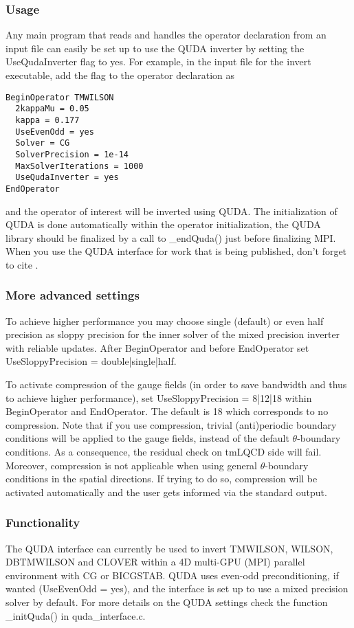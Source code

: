 \subsubsection{Usage}
Any main program that reads and handles the operator declaration from an input file can easily be set up to use the QUDA inverter by setting the {\ttfamily UseQudaInverter} flag to {\ttfamily yes}. For example, in the input file for the {\ttfamily invert} executable, add the flag to the operator declaration as
\begin{verbatim}
BeginOperator TMWILSON
  2kappaMu = 0.05
  kappa = 0.177
  UseEvenOdd = yes
  Solver = CG
  SolverPrecision = 1e-14
  MaxSolverIterations = 1000
  UseQudaInverter = yes
EndOperator
\end{verbatim}
and the operator of interest will be inverted using QUDA. The initialization of QUDA is done automatically within the operator initialization,  the QUDA library should be finalized by a call to {\ttfamily \_endQuda()} just before finalizing MPI. When you use the QUDA interface for work that is being published, don't forget to cite \cite{Clark:2009wm, Babich:2011np, Strelchenko:2013vaa}.


\subsubsection{More advanced settings}
To achieve higher performance you may choose single (default) or even half precision as sloppy precision for the inner solver of the mixed precision inverter with reliable updates. After {\ttfamily BeginOperator} and before {\ttfamily EndOperator} set {\ttfamily UseSloppyPrecision = double|single|half}.

To activate compression of the gauge fields (in order to save bandwidth and thus to achieve higher performance), set {\ttfamily UseSloppyPrecision = 8|12|18} within {\ttfamily BeginOperator} and {\ttfamily EndOperator}. The default is 18 which corresponds to no compression. Note that if you use compression, trivial (anti)periodic boundary conditions will be applied to the gauge fields, instead of the default $\theta$-boundary conditions. As a consequence, the residual check on tmLQCD side will fail. Moreover, compression is not applicable when using general $\theta$-boundary conditions in the spatial directions. If trying to do so, compression will be activated automatically and the user gets informed via the standard output.


\subsubsection{Functionality}
The QUDA interface can currently be used to invert {\ttfamily TMWILSON, WILSON, DBTMWILSON} and {\ttfamily CLOVER} within a 4D multi-GPU (MPI) parallel environment with CG or BICGSTAB. QUDA uses even-odd preconditioning, if wanted ({\ttfamily UseEvenOdd = yes}), and the interface is set up to use a mixed precision solver by default. For more details on the QUDA settings check the function {\ttfamily \_initQuda()} in {\ttfamily quda\_interface.c}.







